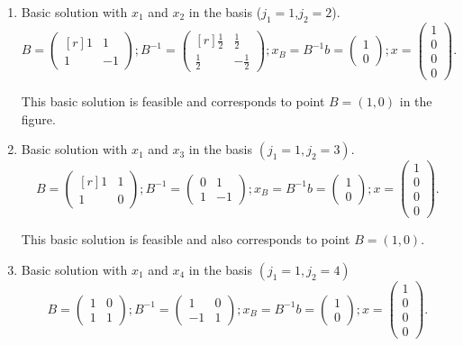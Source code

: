 \begin{enumerate}

\item Basic solution with $x_1$ and $x_2$ in the basis ($j_1=1$,$j_2=2$).
\[
B = 
\begin{pmatrix*}[r]
1 & 1\\
1 &-1
\end{pmatrix*};
B^{-1} =
\begin{pmatrix*}[r]
\frac{1}{2} & \frac{1}{2}\\
\frac{1}{2} &-\frac{1}{2}
\end{pmatrix*};
x_B = B^{-1}b =
\begin{pmatrix}
1 \\
0
\end{pmatrix};
x =
\begin{pmatrix}
1 \\
0 \\
0 \\
0
\end{pmatrix}.
\]

This basic solution is feasible and corresponds to point $B=(1,0)$ in the figure.

\item Basic solution with $x_1$ and $x_3$ in the basis $(j_1=1,j_2=3)$.
\[
B = 
\begin{pmatrix*}[r]
1 & 1\\
1 &0
\end{pmatrix*};
B^{-1} =
\begin{pmatrix*}
0 & 1\\
1 & -1
\end{pmatrix*};
x_B = B^{-1}b =
\begin{pmatrix}
1 \\
0
\end{pmatrix};
x =
\begin{pmatrix}
1 \\
0 \\
0 \\
0
\end{pmatrix}.
\]

This basic solution is feasible and also corresponds to point $B=(1,0)$.

\item Basic solution with $x_1$ and $x_4$ in the basis $(j_1=1,j_2=4)$
\[
B = 
\begin{pmatrix}
1 & 0\\
1 &1
\end{pmatrix};
B^{-1} =
\begin{pmatrix*}
1 & 0\\
-1 & 1
\end{pmatrix*};
x_B = B^{-1}b =
\begin{pmatrix}
1 \\
0
\end{pmatrix};
x =
\begin{pmatrix}
1 \\
0 \\
0 \\
0
\end{pmatrix}.
\]


\end{enumerate}
